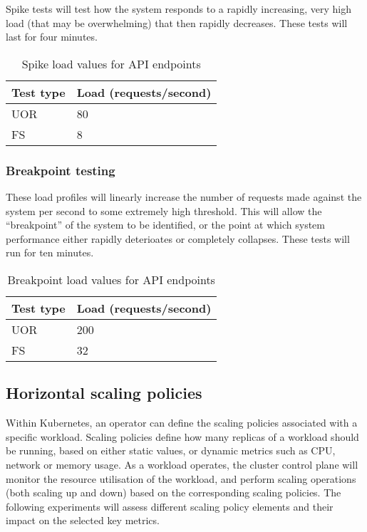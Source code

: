 Spike tests will test how the system responds to a rapidly increasing, very high load (that may be overwhelming) that then rapidly decreases. These tests will last for four minutes.

\begin{table}[h]
    \centering
    \begin{tabularx}{\textwidth}{|X|X|}
        \hline
        \textbf{Test type} & \textbf{Load (requests/second)}  \\ \hline
        UOR & 80 \\ \hline
        FS & 8 \\ \hline
    \end{tabularx}
    \caption{Spike load values for API endpoints}
    \label{table:test-spike-load-plan}
\end{table}

\subsubsection{Breakpoint testing}

These load profiles will linearly increase the number of requests made against the system per second to some extremely high threshold. This will allow the ``breakpoint'' of the system to be identified, or the point at which system performance either rapidly deterioates or completely collapses. These tests will run for ten minutes.

\begin{table}[h]
    \centering
    \begin{tabularx}{\textwidth}{|X|X|}
        \hline
        \textbf{Test type} & \textbf{Load (requests/second)}  \\ \hline
        UOR & 200 \\ \hline
        FS & 32 \\ \hline
    \end{tabularx}
    \caption{Breakpoint load values for API endpoints}
    \label{table:test-breakpoint-load-plan}
\end{table}

\subsection{Horizontal scaling policies}

Within Kubernetes, an operator can define the scaling policies associated with a specific workload. Scaling policies define how many replicas of a workload should be running, based on either static values, or dynamic metrics such as CPU, network or memory usage. As a workload operates, the cluster control plane will monitor the resource utilisation of the workload, and perform scaling operations (both scaling up and down) based on the corresponding scaling policies. The following experiments will assess different scaling policy elements and their impact on the selected key metrics.

